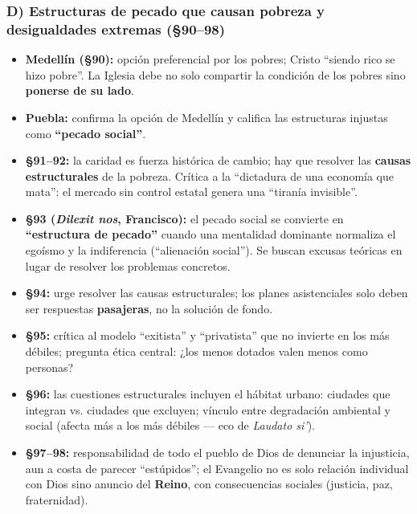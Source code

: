 \documentclass[10pt,a4paper]{article}
\begin{document}
\subsubsection{D) Estructuras de pecado que causan pobreza y desigualdades extremas (\S{}90--98)}
\begin{itemize}
\item \textbf{Medellín (\S{}90):} opción preferencial por los pobres; Cristo ``siendo rico se hizo pobre''. La Iglesia debe no solo compartir la condición de los pobres sino \textbf{ponerse de su lado}.
\item \textbf{Puebla:} confirma la opción de Medellín y califica las estructuras injustas como \textbf{``pecado social''}.
\item \textbf{\S{}91--92:} la caridad es fuerza histórica de cambio; hay que resolver las \textbf{causas estructurales} de la pobreza. Crítica a la ``dictadura de una economía que mata'': el mercado sin control estatal genera una ``tiranía invisible''.
\item \textbf{\S{}93 (\textit{Dilexit nos}, Francisco):} el pecado social se convierte en \textbf{``estructura de pecado''} cuando una mentalidad dominante normaliza el egoísmo y la indiferencia (``alienación social''). Se buscan excusas teóricas en lugar de resolver los problemas concretos.
\item \textbf{\S{}94:} urge resolver las causas estructurales; los planes asistenciales solo deben ser respuestas \textbf{pasajeras}, no la solución de fondo.
\item \textbf{\S{}95:} crítica al modelo ``exitista'' y ``privatista'' que no invierte en los más débiles; pregunta ética central: ¿los menos dotados valen menos como personas?
\item \textbf{\S{}96:} las cuestiones estructurales incluyen el hábitat urbano: ciudades que integran vs. ciudades que excluyen; vínculo entre degradación ambiental y social (afecta más a los más débiles --- eco de \textit{Laudato si'}).
\item \textbf{\S{}97--98:} responsabilidad de todo el pueblo de Dios de denunciar la injusticia, aun a costa de parecer ``estúpidos''; el Evangelio no es solo relación individual con Dios sino anuncio del \textbf{Reino}, con consecuencias sociales (justicia, paz, fraternidad).
\end{itemize}
\end{document}
